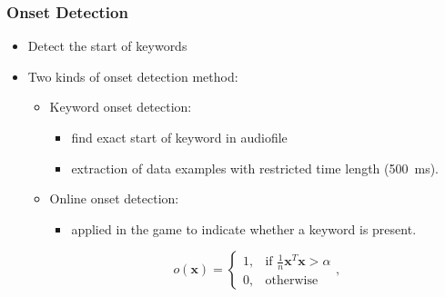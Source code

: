 \begin{frame}
  \frametitle{Onset Detection}
  \begin{itemize}
    \item Detect the start of keywords
    \item Two kinds of onset detection method:
    \begin{itemize}
      \item Keyword onset detection:
      \begin{itemize}
        \item find exact start of keyword in audiofile
        \item extraction of data examples with restricted time length (\SI{500}{\milli\second}).
      \end{itemize}
      \vspace{0.25cm}
      \item Online onset detection:
      \begin{itemize}
        \item applied in the game to indicate whether a keyword is present.
      \end{itemize}
      \vspace{0.25cm}
      \begin{equation*}
        o(\bm{x}) = 
        \begin{cases}
          1, & \text{if } \frac{1}{n} \bm{x}^T \bm{x} > \alpha\\
          0, & \text{otherwise} 
        \end{cases},
      \end{equation*}
    \end{itemize}
  \end{itemize}
\end{frame}

